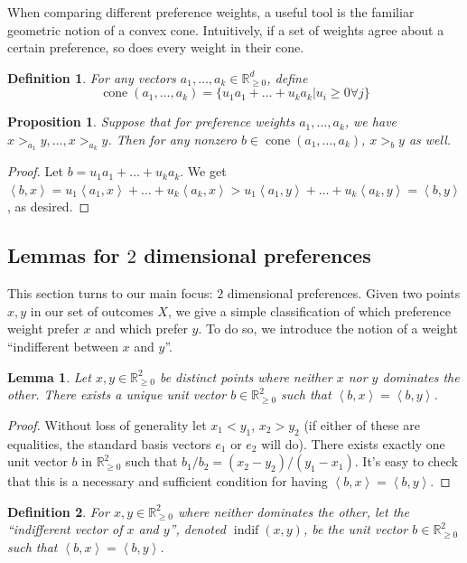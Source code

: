 \documentclass[12pt]{article}
\newtheorem*{definition}{Definition}
\newtheorem{proposition}[theorem]{Proposition}
\newtheorem{lemma}[theorem]{Lemma}
\newcommand{\Rgz}{\mathbb{R}_{\ge 0}}
\newcommand{\ip}[2]{\left\langle{#1},{#2}\right\rangle}
\DeclareMathOperator*{\cone}{cone}
\DeclareMathOperator*{\indif}{indif}
\newcommand{\1}[1]{\mathds{1}[{#1}]}
\begin{document}

    When comparing different preference weights, a useful tool is
    the familiar geometric notion of a convex cone.
    Intuitively, if a set of weights agree about a certain preference,
    so does every weight in their cone.
    \begin{definition}
      For any vectors $a_1,\ldots, a_k \in \Rgz^d$, define
      \[ \cone(a_1,\ldots,a_k) = \{ u_1a_1 + \ldots + u_ka_k | u_i\ge 0 \forall j\} \]
    \end{definition}
    \begin{proposition}\label{prop:conesAgreement}
      Suppose that for preference weights $a_1,\ldots, a_k$,
      we have $x >_{a_1} y, \ldots, x >_{a_k} y$.
      Then for any nonzero $b\in \cone(a_1,\ldots, a_k)$,
      $x >_b y$ as well.
    \end{proposition}
    \begin{proof}
      Let $b = u_1a_1+ \ldots + u_ka_k$.
      We get $\ip{b}{x} = u_1\ip{a_1}{x} + \ldots + u_k\ip{a_k}{x}
      > u_1\ip{a_1}{y} + \ldots + u_k\ip{a_k}{y} = \ip{b}{y}$,
      as desired.
    \end{proof}

  \subsection{Lemmas for $2$ dimensional preferences}

    This section turns to our main focus: $2$ dimensional preferences.
    Given two points $x,y$ in our set of outcomes $X$, we give a simple
    classification of which preference weight prefer $x$ and which prefer $y$.
    To do so, we introduce the notion of a weight ``indifferent between $x$ and $y$''.
    \begin{lemma}
      Let $x,y\in \Rgz^2$ be distinct points where neither 
      $x$ nor $y$ dominates the other.
      There exists a unique unit vector $b\in\Rgz^2$ such that
      $\ip{b}{x} = \ip{b}{y}$.
    \end{lemma}
    \begin{proof}
      Without loss of generality let $x_1 < y_1$, $x_2 > y_2$
      (if either of these are equalities, the standard basis vectors
      $e_1$ or $e_2$ will do).
      There exists exactly one unit vector $b$ in $\Rgz^2$ such that
      $b_1 / b_2 = (x_2 - y_2) / (y_1 - x_1)$.
      It's easy to check that this is a necessary and sufficient 
      condition for having $\ip{b}{x} = \ip{b}{y}$.
    \end{proof}
    \begin{definition}
      For $x,y\in \Rgz^2$ where neither dominates the other,
      let the ``indifferent vector of $x$ and $y$'',
      denoted $\indif(x,y)$, be the unit vector $b\in\Rgz^2$ such 
      that $\ip{b}{x} = \ip{b}{y}$.
    \end{definition}
\end{document}
